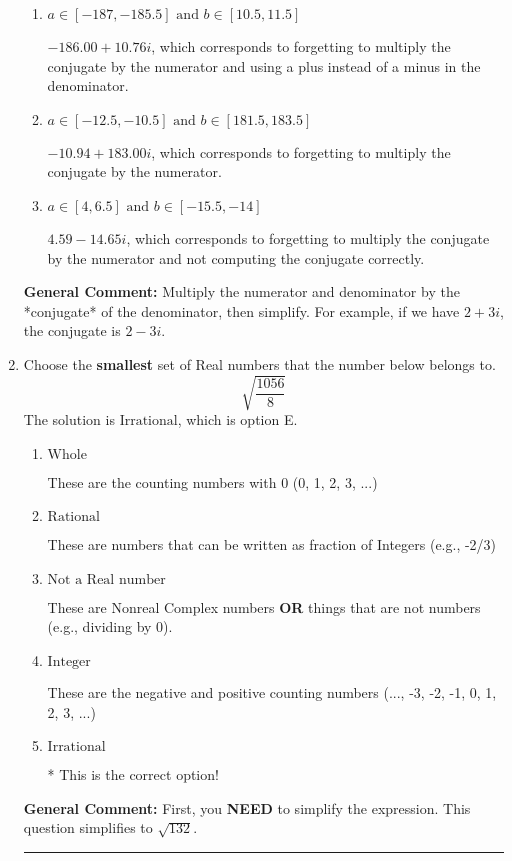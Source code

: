 \documentclass{extbook}[14pt]
\newcommand{\litem}[1]{\item #1

\rule{\textwidth}{0.4pt}}
\begin{document}
\begin{enumerate}
{\begin{enumerate}[label=\Alph*.]
 $-54.00  - 8.25 i$, which corresponds to just dividing the first term by the first term and the second by the second.
\item \( a \in [-187, -185.5] \text{ and } b \in [10.5, 11.5] \)

 $-186.00  + 10.76 i$, which corresponds to forgetting to multiply the conjugate by the numerator and using a plus instead of a minus in the denominator.
\item \( a \in [-12.5, -10.5] \text{ and } b \in [181.5, 183.5] \)

 $-10.94  + 183.00 i$, which corresponds to forgetting to multiply the conjugate by the numerator.
\item \( a \in [4, 6.5] \text{ and } b \in [-15.5, -14] \)

 $4.59  - 14.65 i$, which corresponds to forgetting to multiply the conjugate by the numerator and not computing the conjugate correctly.
\end{enumerate}

\textbf{General Comment:} Multiply the numerator and denominator by the *conjugate* of the denominator, then simplify. For example, if we have $2+3i$, the conjugate is $2-3i$.
}
\litem{
Choose the \textbf{smallest} set of Real numbers that the number below belongs to.
\[ \sqrt{\frac{1056}{8}} \]The solution is \( \text{Irrational} \), which is option E.\begin{enumerate}[label=\Alph*.]
\item \( \text{Whole} \)

These are the counting numbers with 0 (0, 1, 2, 3, ...)
\item \( \text{Rational} \)

These are numbers that can be written as fraction of Integers (e.g., -2/3)
\item \( \text{Not a Real number} \)

These are Nonreal Complex numbers \textbf{OR} things that are not numbers (e.g., dividing by 0).
\item \( \text{Integer} \)

These are the negative and positive counting numbers (..., -3, -2, -1, 0, 1, 2, 3, ...)
\item \( \text{Irrational} \)

* This is the correct option!
\end{enumerate}

\textbf{General Comment:} First, you \textbf{NEED} to simplify the expression. This question simplifies to $\sqrt{132}$. 
 
}
\end{enumerate}
\end{document}
